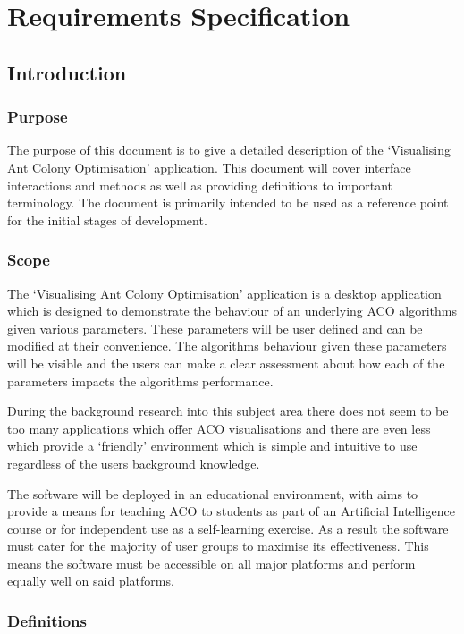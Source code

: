 
\chapter{Requirements Specification}
\renewcommand{\thechapter}{\Alph{chapter}}
\section{Introduction}

\subsection{Purpose}

The purpose of this document is to give a detailed description of the `Visualising Ant Colony Optimisation' application. This document will cover interface interactions and methods as well as providing definitions to important terminology. The document is primarily intended to be used as a reference point for the initial stages of development.

\subsection{Scope}

The `Visualising Ant Colony Optimisation' application is a desktop application which is designed to demonstrate the behaviour of an underlying ACO algorithms given various parameters. These parameters will be user defined and can be modified at their convenience. The algorithms behaviour given these parameters will be visible and the users can make a clear assessment about how each of the parameters impacts the algorithms performance.

During the background research into this subject area there does not seem to be too many applications which offer ACO visualisations and there are even less which provide a `friendly' environment which is simple and intuitive to use regardless of the users background knowledge.

The software will be deployed in an educational environment, with aims to provide a means for teaching ACO to students as part of an Artificial Intelligence course or for independent use as a self-learning exercise. As a result the software must cater for the majority of user groups to maximise its effectiveness. This means the software must be accessible on all major platforms and perform equally well on said platforms.

\subsection{Definitions}

